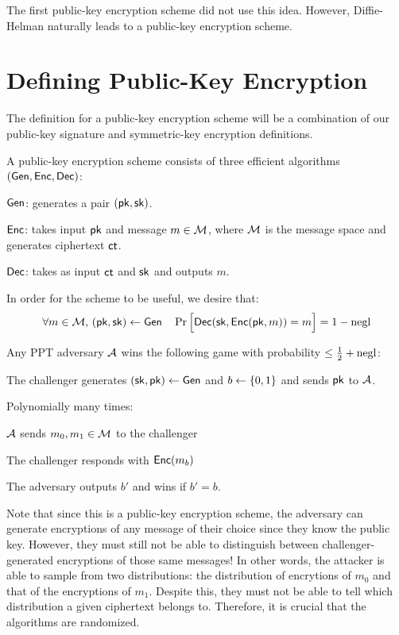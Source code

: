 
The first public-key encryption scheme did not use this idea. However, Diffie-Helman naturally leads to a public-key encryption scheme.

\section{Defining Public-Key Encryption}
The definition for a public-key encryption scheme will be a combination of our public-key signature and symmetric-key encryption definitions.

\begin{definition}
	A public-key encryption scheme consists of three efficient algorithms $(\mathsf{Gen}, \mathsf{Enc}, \mathsf{Dec})$:
	\begin{compactitem}
		\item $\mathsf{Gen}$: generates a pair $(\mathsf{pk}, {\mathsf{sk}})$.
		\item $\mathsf{Enc}$: takes input $\mathsf{pk}$ and message $m \in \mathcal{M}$, where $\mathcal{M}$ is the message space and generates ciphertext $\mathsf{ct}$.
		\item $\mathsf{Dec}$: takes as input $\mathsf{ct}$ and ${\mathsf{sk}}$ and outputs $m$.
	\end{compactitem}
\end{definition}

\begin{definition}
	In order for the scheme to be useful, we desire that:
	\[ \forall m \in \mathcal{M}, \, (\mathsf{pk}, {\mathsf{sk}}) \gets \mathsf{Gen} \quad \Pr\Big[ \mathsf{Dec}({\mathsf{sk}}, \mathsf{Enc}(\mathsf{pk}, m)) = m \Big] = 1 - \operatorname{negl} \]
\end{definition}

\begin{definition}
	Any PPT adversary $\mathcal{A}$ wins the following game with probability $\leq \tfrac{1}{2} + \operatorname{negl}$:

	\begin{compactitem}
		\item The challenger generates $({\mathsf{sk}}, \mathsf{pk}) \gets \mathsf{Gen}$ and $b \gets \{0,1\}$ and sends $\mathsf{pk}$ to $\mathcal{A}$.
		\item Polynomially many times:
			\begin{compactitem}
			\item $\mathcal{A}$ sends $m_0, m_1 \in \mathcal{M}$ to the challenger
			\item The challenger responds with $\mathsf{Enc}(m_b)$		
			\end{compactitem}
		\item The adversary outputs $b'$ and wins if $b' = b$.
	\end{compactitem}
\end{definition}
	Note that since this is a public-key encryption scheme, the adversary can generate encryptions of any message of their choice since they know the public key. However, they must still not be able to distinguish between challenger-generated encryptions of those same messages! In other words, the attacker is able to sample from two distributions: the distribution of encrytions of $m_0$ and that of the encryptions of $m_1$. Despite this, they must not be able to tell which distribution a given ciphertext belongs to. Therefore, it is crucial that the algorithms are randomized.

